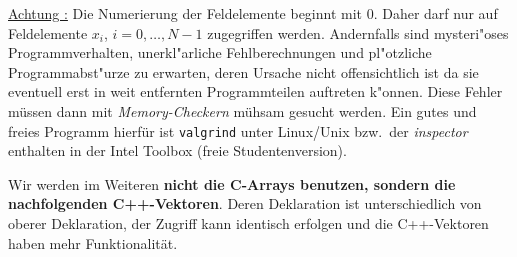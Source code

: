 \underline{Achtung :} Die Numerierung der Feldelemente
beginnt mit 0. Daher darf nur auf Feldelemente
$x_i$, $i=0,\ldots,N-1$ zugegriffen werden.
Andernfalls sind mysteri"oses Programmverhalten,
unerkl"arliche Fehlberechnungen und pl"otzliche Programmabst"urze
zu erwarten, deren Ursache nicht offensichtlich ist da
sie eventuell erst in weit entfernten Programmteilen auftreten k"onnen.
Diese Fehler müssen dann mit \emph{Memory-Checkern} mühsam gesucht werden. 
Ein gutes und freies Programm hierfür ist \texttt{valgrind} unter Linux/Unix bzw.\
der \emph{inspector} enthalten in der Intel Toolbox (freie Studentenversion).

Wir werden im Weiteren \textbf{nicht die C-Arrays benutzen, sondern die nachfolgenden C++-Vektoren}.
Deren Deklaration ist unterschiedlich von oberer Deklaration, der Zugriff kann identisch erfolgen
und die C++-Vektoren haben mehr Funktionalität.
%
%
